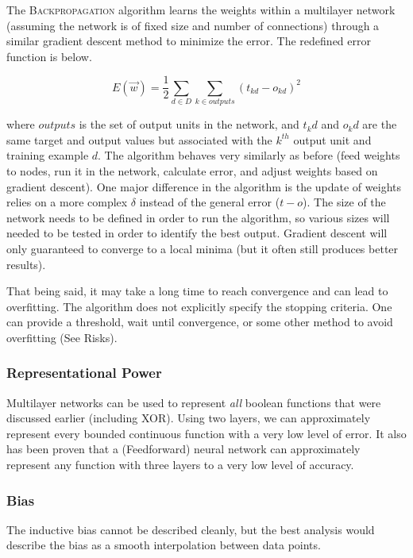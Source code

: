 \documentclass[titlepage,11pt]{article}
\begin{document}
The \textsc{Backpropagation} algorithm learns the weights within a multilayer network (assuming the network is of fixed size and number of connections) through a similar gradient descent method to minimize the error. The redefined error function is below.

\begin{equation}
E(\vec{w}) = \frac12 \sum_{d\in D} \sum_{k \in outputs}{(t_{kd} - o_{kd})^2}
\end{equation}

where $outputs$ is the set of output units in the network, and $t_kd$ and $o_kd$ are the same target and output values but associated with the $k^{th}$ output unit and training example $d$. The algorithm behaves very similarly as before (feed weights to nodes, run it in the network, calculate error, and adjust weights based on gradient descent). One major difference in the algorithm is the update of weights relies on a more complex $\delta$ instead of the general error ($t-o$). The size of the network needs to be defined in order to run the algorithm, so various sizes will needed to be tested in order to identify the best output. Gradient descent will only guaranteed to converge to a local minima (but it often still produces better results).

That being said, it may take a long time to reach convergence and can lead to overfitting. The algorithm does not explicitly specify the stopping criteria. One can provide a threshold, wait until convergence, or some other method to avoid overfitting (See Risks).

\subsubsection*{Representational Power}

Multilayer networks can be used to represent \textit{all} boolean functions that were discussed earlier (including XOR). Using two layers, we can approximately represent every bounded continuous function with a very low level of error. It also has been proven that a (Feedforward) neural network can approximately represent any function with three layers to a very low level of accuracy.

\subsubsection*{Bias}

The inductive bias cannot be described cleanly, but the best analysis would describe the bias as a smooth interpolation between data points.
\end{document}
